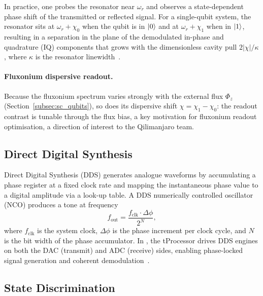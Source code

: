 In practice, one probes the resonator near $\omega_r$ and
observes a state-dependent phase shift of the transmitted or reflected signal.
For a single-qubit system, the resonator sits at $\omega_r + \chi_0$ when the
qubit is in $\ket{0}$ and at $\omega_r + \chi_1$ when in $\ket{1}$, resulting
in a separation in the plane of the demodulated in-phase and quadrature (IQ)
components that grows with the dimensionless cavity pull
$2|\chi|/\kappa$, where $\kappa$ is the resonator linewidth~\cite{Blais2004,Wallraff2004}.

\paragraph{Fluxonium dispersive readout.}
Because the fluxonium spectrum varies strongly with the external flux $\Phi_z$
(Section~\ref{subsec:sc_qubits}), so
does its dispersive shift $\chi = \chi_1 - \chi_0$: the readout contrast is
tunable through the flux bias, a key motivation for fluxonium readout
optimisation, a direction of interest to the Qilimanjaro team.

\subsection{Direct Digital Synthesis}
\label{subsec:dds}

Direct Digital Synthesis (DDS) generates analogue waveforms by accumulating a
phase register at a fixed clock rate and mapping the instantaneous phase value to
a digital amplitude via a look-up table.  A DDS numerically controlled oscillator
(NCO) produces a tone at frequency
\begin{equation}
  f_\text{out} = \frac{f_\text{clk} \cdot \Delta\phi}{2^N},
\end{equation}
where $f_\text{clk}$ is the system clock, $\Delta\phi$ is the phase increment per
clock cycle, and $N$ is the bit width of the phase accumulator.  In \QICK{}, the tProcessor drives DDS
engines on both the DAC (transmit) and ADC (receive) sides, enabling phase-locked
signal generation and coherent demodulation~\cite{Stefanazzi2022}.

\subsection{State Discrimination}
\label{subsec:state_discrim}


